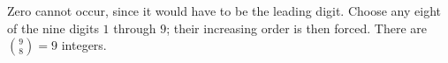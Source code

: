 Zero cannot occur, since it would have to be the leading digit. Choose any eight of the nine digits $1$ through $9$; their increasing order is then forced. There are $\binom98=\boxed9$ integers.
